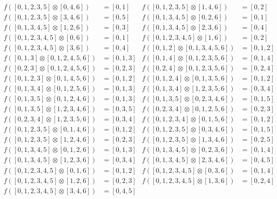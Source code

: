 \begin{align*}
f( [0, 1, 2, 3, 5] \otimes [0, 4, 6] )&= [0, 1] &
f( [0, 1, 2, 3, 5] \otimes [1, 4, 6] )&= [0, 2] \\
f( [0, 1, 2, 3, 5] \otimes [3, 4, 6] )&= [0, 5] &
f( [0, 1, 3, 4, 5] \otimes [0, 2, 6] )&= [0, 1] \\
f( [0, 1, 3, 4, 5] \otimes [1, 2, 6] )&= [0, 3] &
f( [0, 1, 3, 4, 5] \otimes [2, 3, 6] )&= [0, 4] \\
f( [0, 1, 2, 3, 4, 5] \otimes [0, 6] )&= [0, 1] &
f( [0, 1, 2, 3, 4, 5] \otimes [1, 6] )&= [0, 2] \\
f( [0, 1, 2, 3, 4, 5] \otimes [3, 6] )&= [0, 4] &
f( [0, 1, 2] \otimes [0, 1, 3, 4, 5, 6] )&= [0, 1, 2] \\
f( [0, 1, 3] \otimes [0, 1, 2, 4, 5, 6] )&= [0, 1, 3] &
f( [0, 1, 4] \otimes [0, 1, 2, 3, 5, 6] )&= [0, 1, 4] \\
f( [0, 2, 3] \otimes [0, 1, 2, 4, 5, 6] )&= [0, 2, 3] &
f( [0, 2, 4] \otimes [0, 1, 2, 3, 5, 6] )&= [0, 2, 4] \\
f( [0, 1, 2, 3] \otimes [0, 1, 4, 5, 6] )&= [0, 1, 2] &
f( [0, 1, 2, 4] \otimes [0, 1, 3, 5, 6] )&= [0, 1, 2] \\
f( [0, 1, 3, 4] \otimes [0, 1, 2, 5, 6] )&= [0, 1, 3] &
f( [0, 1, 3, 4] \otimes [1, 2, 3, 5, 6] )&= [0, 3, 4] \\
f( [0, 1, 3, 5] \otimes [0, 1, 2, 4, 6] )&= [0, 1, 3] &
f( [0, 1, 3, 5] \otimes [0, 2, 3, 4, 6] )&= [0, 1, 5] \\
f( [0, 1, 3, 5] \otimes [1, 2, 3, 4, 6] )&= [0, 3, 5] &
f( [0, 2, 3, 4] \otimes [0, 1, 2, 5, 6] )&= [0, 2, 3] \\
f( [0, 2, 3, 4] \otimes [1, 2, 3, 5, 6] )&= [0, 3, 4] &
f( [0, 1, 2, 3, 4] \otimes [0, 1, 5, 6] )&= [0, 1, 2] \\
f( [0, 1, 2, 3, 5] \otimes [0, 1, 4, 6] )&= [0, 1, 2] &
f( [0, 1, 2, 3, 5] \otimes [0, 3, 4, 6] )&= [0, 1, 5] \\
f( [0, 1, 2, 3, 5] \otimes [1, 2, 4, 6] )&= [0, 2, 3] &
f( [0, 1, 2, 3, 5] \otimes [1, 3, 4, 6] )&= [0, 2, 5] \\
f( [0, 1, 3, 4, 5] \otimes [0, 1, 2, 6] )&= [0, 1, 3] &
f( [0, 1, 3, 4, 5] \otimes [0, 2, 3, 6] )&= [0, 1, 4] \\
f( [0, 1, 3, 4, 5] \otimes [1, 2, 3, 6] )&= [0, 3, 4] &
f( [0, 1, 3, 4, 5] \otimes [2, 3, 4, 6] )&= [0, 4, 5] \\
f( [0, 1, 2, 3, 4, 5] \otimes [0, 1, 6] )&= [0, 1, 2] &
f( [0, 1, 2, 3, 4, 5] \otimes [0, 3, 6] )&= [0, 1, 4] \\
f( [0, 1, 2, 3, 4, 5] \otimes [1, 2, 6] )&= [0, 2, 3] &
f( [0, 1, 2, 3, 4, 5] \otimes [1, 3, 6] )&= [0, 2, 4] \\
f( [0, 1, 2, 3, 4, 5] \otimes [3, 4, 6] )&= [0, 4, 5] 
\end{align*}
